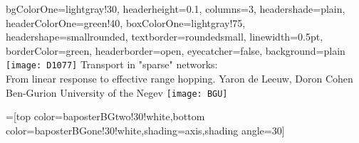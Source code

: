 \documentclass[portrait,draft,a0paper]{baposter}
\begin{document}
\begin{poster}%
  {
  bgColorOne=lightgray!30,
  headerheight=0.1\textheight,
  columns=3,
  headershade=plain,
  headerColorOne=green!40,
  boxColorOne=lightgray!75,
  headershape=smallrounded,
  textborder=roundedsmall,
  linewidth=0.5pt,
  borderColor=green,
  headerborder=open,
  eyecatcher=false,
  background=plain
}
  {\texttt{[image: D1077]}} %
  {\sf 
Transport in "sparse" networks:\\ 
From linear response to effective range hopping.
  }
  {\sf
  \vspace{2em}  {\hspace{2em}Yaron de Leeuw, Doron Cohen\\Ben-Gurion University of the Negev}%
  }
  {\hspace{1em}\texttt{[image: BGU]}\
  }

  =[top color=baposterBGtwo!30!white,bottom color=baposterBGone!30!white,shading=axis,shading angle=30]




\end{poster}
\end{document}
